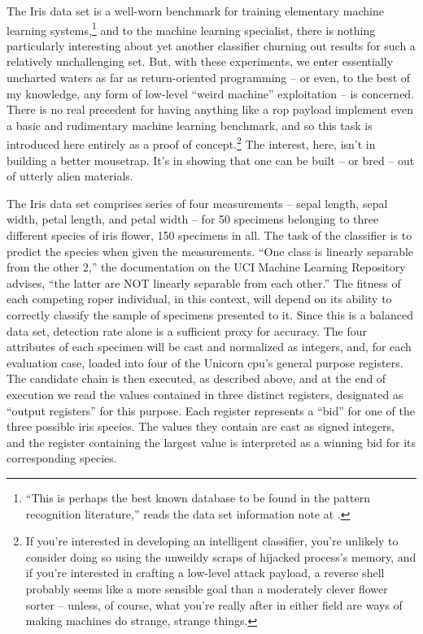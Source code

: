 \documentclass[12pt,glossary]{dalthesis}
\begin{document}
The Iris data set is a well-worn benchmark for training elementary
machine learning systems,\footnote{``This is perhaps the best known database to be found in the pattern
  recognition literature,'' reads the data set information note at \cite{iris}.} and to the machine learning specialist, there is
nothing particularly interesting about yet another classifier churning out
results for such a relatively unchallenging set.
But, with these experiments, we enter essentially uncharted waters as far as
return-oriented programming -- or even, to the best of my knowledge, any form of
low-level ``weird machine'' exploitation -- is concerned. There is no real
precedent for having anything like a \gls{rop} payload implement even a basic and
rudimentary machine learning benchmark, and so this task is introduced here
entirely as a proof of concept.\footnote{If you're interested in developing an
 intelligent classifier, you're unlikely to consider doing so using the unweildy
 scraps of hijacked process's memory, and if you're interested in crafting a
 low-level attack payload, a reverse shell probably seems like a more sensible
 goal than a moderately clever flower sorter -- unless, of course, what you're
 really after in either field are ways of making machines do strange, strange
 things.} The interest, here, isn't in building a better mousetrap. It's in
showing that one can be built -- or bred -- out of utterly alien materials.


The Iris data set comprises series of four measurements -- sepal length,
sepal width, petal length, and petal width --
for 50 specimens belonging to three different species of iris flower, 150
specimens in all. The task of the classifier is to predict the species when
given the measurements. ``One class is linearly separable from the other 2,''
the documentation on the UCI Machine Learning Repository advises, ``the latter
are NOT linearly separable from each other.'' 
The fitness of each competing \gls{roper} individual, in this context, will
depend on its ability to correctly classify the sample of specimens presented
to it. Since this is a balanced data set, detection rate alone is a sufficient
proxy for accuracy. The four attributes of each specimen will be cast and
normalized as integers, and, for each evaluation case, loaded into four of
the Unicorn \gls{cpu}'s general purpose registers. The candidate chain is then
executed, as described above, and at the end of execution we read the values
contained in three distinct registers, designated as ``output registers'' for
this purpose. Each register represents a ``bid'' for one of the three possible
iris species. The values they contain are cast as signed integers, and the
register containing the largest value is interpreted as a winning bid for
its corresponding species. 
\end{document}

